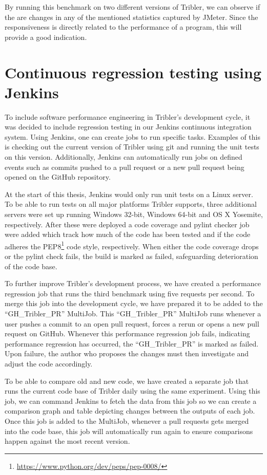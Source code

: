 By running this benchmark on two different versions of Tribler, we can observe if the are changes in any of the mentioned statistics captured by JMeter.
Since the responsiveness is directly related to the performance of a program, this will provide a good indication.


\section{Continuous regression testing using Jenkins}

To include software performance engineering in Tribler's development cycle, it was decided to include regression testing in our Jenkins continuous integration system.
Using Jenkins, one can create jobs to run specific tasks.
Examples of this is checking out the current version of Tribler using git and running the unit tests on this version.
Additionally, Jenkins can automatically run jobs on defined events such as commits pushed to a pull request or a new pull request being opened on the GitHub repository.

At the start of this thesis, Jenkins would only run unit tests on a Linux server.
To be able to run tests on all major platforms Tribler supports, three additional servers were set up running Windows 32-bit, Windows 64-bit and OS X Yosemite, respectively.
After these were deployed a code coverage and pylint checker job were added which track how much of the code has been tested and if the code adheres the PEP8\footnote{\url{https://www.python.org/dev/peps/pep-0008/}} code style, respectively.
When either the code coverage drops or the pylint check fails, the build is marked as failed, safeguarding deterioration of the code base.

To further improve Tribler's development process, we have created a performance regression job that runs the third benchmark using five requests per second.
To merge this job into the development cycle, we have prepared it to be added to the \enquote{GH\_Tribler\_PR} MultiJob.
This \enquote{GH\_Tribler\_PR} MultiJob runs whenever a user pushes a commit to an open pull request, forces a rerun or opens a new pull request on GitHub.
Whenever this performance regression job fails, indicating performance regression has occurred, the \enquote{GH\_Tribler\_PR} is marked as failed.
Upon failure, the author who proposes the changes must then investigate and adjust the code accordingly.

To be able to compare old and new code, we have created a separate job that runs the current code base of Tribler daily using the same experiment.
Using this job, we can command Jenkins to fetch the data from this job so we can create a comparison graph and table depicting changes between the outputs of each job.
Once this job is added to the MultiJob, whenever a pull requests gets merged into the code base, this job will automatically run again to ensure comparisons happen against the most recent version.

